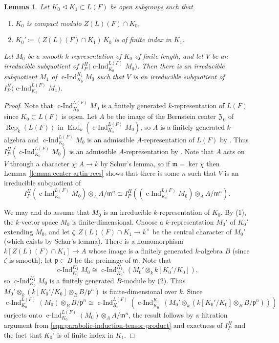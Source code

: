 \documentclass[reqno]{amsart}
\numberwithin{equation}{subsection}
\newcommand{\co}{\colon}
\newcommand\frZ{\mathfrak{Z}}
\newcommand\frp{\mathfrak{p}}
\DeclareMathOperator{\Rep}{Rep}
\DeclareMathOperator{\End}{End}
\DeclareMathOperator{\cInd}{c-Ind}
\newtheorem{lemma}[thm]{Lemma}
\theoremstyle{remark}
\numberwithin{equation}{subsection}
\numberwithin{figure}{subsection}
\begin{document}
\begin{lemma}\label{lemma:family-to-fiber}
Let $K_0 \trianglelefteq K_1 \subset L(F)$ be open subgroups such that 
\begin{enumerate}
\item $K_0$ is compact modulo $Z(L)(F)\cap K_0$,
\item $K_0' \coloneqq (Z(L)(F)\cap K_1)\,K_0$ is of finite index in $K_1$.
\end{enumerate} 
Let $M_0$ be a smooth $k$-representation of $K_0$ of finite length, and let $V$ be an irreducible subquotient of $I_P^H\bigl(\cInd_{K_0}^{L(F)}M_0\bigr)$. Then there is an irreducible subquotient $M_1$ of $\cInd_{K_0}^{K_1}M_0$ such that $V$ is an irreducible subquotient of $I_P^H\bigl(\cInd_{K_1}^{L(F)}M_1\bigr)$.
\end{lemma}

\begin{proof}
Note that $\cInd_{K_0}^{L(F)} M_0$ is a finitely generated $k$-representation of $L(F)$ since $K_0 \subset L(F)$ is open. Let $A$ be the image of the Bernstein center $\frZ_L$ of $\Rep_k(L(F))$ in $\End_k(\cInd_{K_0}^{L(F)} M_0)$, so $A$ is a finitely generated $k$-algebra and $\cInd_{K_0}^{L(F)} M_0$ is an admissible $A$-representation of $L(F)$ by \cite[Theorem 1.2]{DHKM}. Thus $I_P^H(\cInd_{K_0}^{L(F)} M_0)$ is an admissible $A$-representation by \cite[Chapitre II, no.\ 2.1 (i)]{Vig96}. Note that $A$ acts on $V$ through a character $\chi\co A \to k$ by Schur's lemma, so if $\mathfrak{m} = \ker \chi$ then Lemma~\ref{lemma:center-artin-rees} shows that there is some $n$ such that $V$ is an irreducible subquotient of
\begin{equation}\label{eqn:parabolic-induction-tensor-product}
I_P^H(\cInd_{K_0}^{L(F)} M_0) \otimes_A A/\mathfrak{m}^n \cong I_P^H((\cInd_{K_0}^{L(F)} M_0) \otimes_A A/\mathfrak{m}^n).
\end{equation}

We may and do assume that $M_0$ is an irreducible $k$-representation of $K_0$. By (1), the $k$-vector space $M_0$ is finite-dimensional. Choose a $k$-representation $M_0'$ of $K_0'$ extending $M_0$, and let $\zeta\co Z(L)(F) \cap K_1 \to k^\times$ be the central character of $M_0'$ (which exists by Schur's lemma). There is a homomorphism $k[Z(L)(F) \cap K_1] \to A$ whose image is a finitely generated $k$-algebra $B$ (since $\zeta$ is smooth); let $\frp \subset B$ be the preimage of $\mathfrak{m}$. Note that
\[
\cInd_{K_0}^{K_1} M_0 \cong \cInd_{K_0'}^{K_1}(M_0' \otimes_k k[K_0'/K_0]),
\]
so $\cInd_{K_0}^{K_1} M_0$ is a finitely generated $B$-module by (2). Thus $M_0' \otimes_k (k[K_0'/K_0] \otimes_B B/\frp^n)$ is finite-dimensional over $k$. Since
\[
\cInd_{K_0}^{L(F)}(M_0) \otimes_B B/\frp^n \cong \cInd_{K_1}^{L(F)}(\cInd_{K_0'}^{K_1}(M_0' \otimes_k (k[K_0'/K_0] \otimes_B B/\frp^n)))
\]
surjects onto $\cInd_{K_0}^{L(F)}(M_0) \otimes_A A/\mathfrak{m}^n$, the result follows by a filtration argument from \eqref{eqn:parabolic-induction-tensor-product} and exactness of $I_P^H$ \cite[Chapitre II, no.\ 2.1 (v)]{Vig96} and the fact that $K_0'$ is of finite index in $K_1$.
\end{proof}
\end{document}
